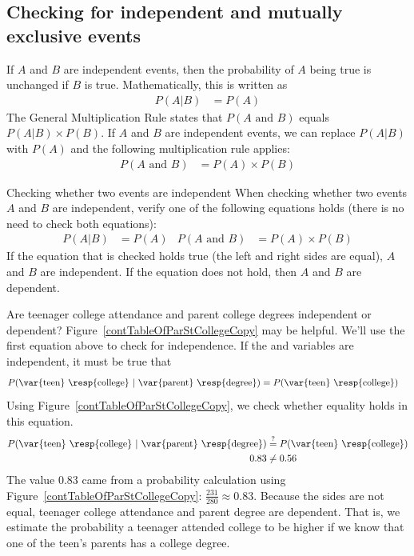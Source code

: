 \subsection{Checking for independent and mutually exclusive events}

If $A$ and $B$ are independent events, then the probability of $A$ being true is unchanged if $B$ is true. Mathematically, this is written as
\begin{align*}
P(A|B) &= P(A)
\end{align*}
The General Multiplication Rule states that $P(A\text{ and }B)$ equals $P(A | B)\times P(B)$. If $A$ and $B$ are independent events, we can replace $P(A|B)$ with $P(A)$ and the following multiplication rule applies:
\begin{align*}
P(A\text{ and }B) &= P(A)\times P(B)
\end{align*}

\begin{onebox}{Checking whether two events are independent}
When checking whether two events $A$ and $B$ are independent, verify one of the following equations holds (there is no need to check both equations):
\begin{align*}
P(A|B) &= P(A)&
P(A\text{ and }B) &= P(A)\times P(B)
\end{align*}
If the equation that is checked holds true (the left and right sides are equal), $A$ and $B$ are independent. If the equation does not hold, then $A$ and $B$ are dependent.\end{onebox}

\D{\newpage}

\begin{examplewrap}
\begin{nexample}{Are teenager college attendance and parent college degrees independent or dependent? Figure~\ref{contTableOfParStCollegeCopy} may be helpful.}\label{teenParentCollegeIndependentExample}
We'll use the first equation above to check for independence. If the  and  variables are independent, it must be true that
\begin{align*}
P(\text{\var{teen} \resp{college}}\ |\ \text{\var{parent} \resp{degree}})
	&= P(\text{\var{teen} \resp{college}})
\end{align*}
Using Figure~\ref{contTableOfParStCollegeCopy}, we check whether equality holds in this equation.
\begin{align*}
P(\text{\var{teen} \resp{college}}\ |\ \text{\var{parent} \resp{degree}})
	&\overset{?}{=} P(\text{\var{teen} \resp{college}}) \\
0.83 &\neq 0.56
\end{align*}
The value 0.83 came from a probability calculation using Figure~\ref{contTableOfParStCollegeCopy}: $\frac{231}{280} \approx 0.83$. Because the sides are not equal, teenager college attendance and parent degree are dependent. That is, we estimate the probability a teenager attended college to be higher if we know that one of the teen's parents has a college degree.
\end{nexample}
\end{examplewrap}

